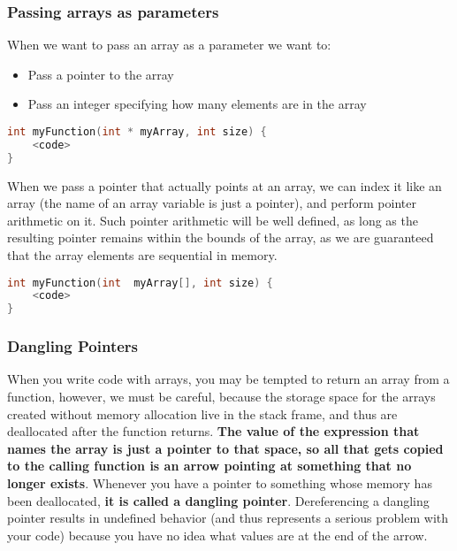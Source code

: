 \documentclass[12pt,a4paper]{article}
\begin{document}
\subsubsection{Passing arrays as parameters}

When we want to pass an array as a parameter we want to:
\begin{itemize}
	\item Pass a pointer to the array
	\item Pass an integer specifying how many elements are in the array
\end{itemize}

\begin{lstlisting}[language=C]
int myFunction(int * myArray, int size) {
	<code>
}
\end{lstlisting}

When we pass a pointer that actually points at an array, we can index it like
an array (the name of an array variable is just a pointer), and perform pointer
arithmetic on it. Such pointer arithmetic will be well defined, as long as the
resulting pointer remains within the bounds of the array, as we are guaranteed
that the array elements are sequential in memory.

\begin{lstlisting}[language=C]
int myFunction(int  myArray[], int size) {
	<code>
}
\end{lstlisting}

\subsubsection{Dangling Pointers}
When you write code with arrays, you may be tempted to return an array from a
function, however, we must be careful, because the storage space for the arrays
created without memory allocation live in the stack frame, and thus are
deallocated after the function returns. \textbf{The value of the expression
that names the array is just a pointer to that space, so all that gets copied
to the calling function is an arrow pointing at something that no longer
exists}. Whenever you have a pointer to something whose memory has been
deallocated, \textbf{it is called a dangling pointer}. Dereferencing a dangling
pointer results in undefined behavior (and thus represents a serious problem
with your code) because you have no idea what values are at the end of the
arrow.
\end{document}
